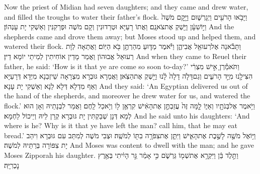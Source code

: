 {Now the priest of Midian had seven daughters; and they came and drew water, and filled the troughs to water their father’s flock.}{}
{וַיָּבֹ֥אוּ הָרֹעִ֖ים וַיְגָרְשׁ֑וּם וַיָּ֤קׇם מֹשֶׁה֙ וַיּ֣וֹשִׁעָ֔ן וַיַּ֖שְׁקְ אֶת\maqqaf צֹאנָֽם׃}
{וַאֲתוֹ רָעַיָּא וּטְרַדוּנִין וְקָם מֹשֶׁה וּפְרַקִנִּין וְאַשְׁקִי יָת עָנְהוֹן׃}
{And the shepherds came and drove them away; but Moses stood up and helped them, and watered their flock.}{}
{וַתָּבֹ֕אנָה אֶל\maqqaf רְעוּאֵ֖ל אֲבִיהֶ֑ן וַיֹּ֕אמֶר מַדּ֛וּעַ מִהַרְתֶּ֥ן בֹּ֖א הַיּֽוֹם׃}
{וַאֲתַאָה לְוָת רְעוּאֵל אֲבוּהוֹן וַאֲמַר מָדֵין אוֹחִיתִין לְמֵיתֵי יוֹמָא דֵין׃}
{And when they came to Reuel their father, he said: ‘How is it that ye are come so soon to-day?’}{}
{וַתֹּאמַ֕רְןָ אִ֣ישׁ מִצְרִ֔י הִצִּילָ֖נוּ מִיַּ֣ד הָרֹעִ֑ים וְגַם\maqqaf דָּלֹ֤ה דָלָה֙ לָ֔נוּ וַיַּ֖שְׁקְ אֶת\maqqaf הַצֹּֽאן׃}
{וַאֲמַרָא גּוּבְרָא מִצְרָאָה שֵׁיזְבַנָא מִיְּדָא דְּרָעַיָּא וְאַף מִדְלָא דְּלָא לַנָא וְאַשְׁקִי יָת עָנָא׃}
{And they said: ‘An Egyptian delivered us out of the hand of the shepherds, and moreover he drew water for us, and watered the flock.’}{}
{וַיֹּ֥אמֶר אֶל\maqqaf בְּנֹתָ֖יו וְאַיּ֑וֹ לָ֤מָּה זֶּה֙ עֲזַבְתֶּ֣ן אֶת\maqqaf הָאִ֔ישׁ קִרְאֶ֥ן ל֖וֹ וְיֹ֥אכַל לָֽחֶם׃}
{וַאֲמַר לִבְנָתֵיהּ וְאָן הוּא לְמָא דְּנָן שְׁבַקְתִּין יָת גּוּבְרָא קְרַן לֵיהּ וְיֵיכוֹל לַחְמָא׃}
{And he said unto his daughters: ‘And where is he? Why is it that ye have left the man? call him, that he may eat bread.’}{}
{וַיּ֥וֹאֶל מֹשֶׁ֖ה לָשֶׁ֣בֶת אֶת\maqqaf הָאִ֑ישׁ וַיִּתֵּ֛ן אֶת\maqqaf צִפֹּרָ֥ה בִתּ֖וֹ לְמֹשֶֽׁה׃}
{וּצְבִי מֹשֶׁה לְמִתַּב עִם גּוּבְרָא וִיהַב יָת צִפּוֹרָה בְּרַתֵּיהּ לְמֹשֶׁה׃}
{And Moses was content to dwell with the man; and he gave Moses Zipporah his daughter.}{}
{וַתֵּ֣לֶד בֵּ֔ן וַיִּקְרָ֥א אֶת\maqqaf שְׁמ֖וֹ גֵּרְשֹׁ֑ם כִּ֣י אָמַ֔ר גֵּ֣ר הָיִ֔יתִי בְּאֶ֖רֶץ נׇכְרִיָּֽה׃ \petucha }
